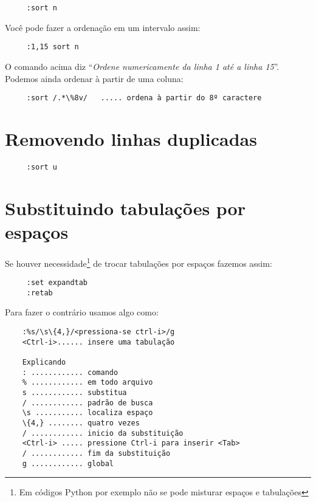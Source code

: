 \begin{verbatim}
     :sort n
\end{verbatim}

Você pode fazer a ordenação em um intervalo assim:

\begin{verbatim}
     :1,15 sort n
\end{verbatim}

O comando acima diz ``{\em Ordene numericamente da linha 1 até a linha 15}''.  
Podemos ainda ordenar à partir de uma coluna:

\begin{verbatim}
     :sort /.*\%8v/   ..... ordena à partir do 8º caractere
\end{verbatim}

\section{Removendo linhas duplicadas}

\begin{verbatim}
     :sort u
\end{verbatim}

\section{Substituindo tabulações por espaços}
\label{sec:Substituindo tabulações por espaços}

Se houver necessidade\footnote{Em códigos Python por exemplo não se pode
misturar espaços e tabulações} de trocar tabulações por espaços
fazemos assim:

\begin{verbatim}
	 :set expandtab
	 :retab
\end{verbatim}

Para fazer o contrário usamos algo como:

\begin{verbatim}
    :%s/\s\{4,}/<pressiona-se ctrl-i>/g
    <Ctrl-i>...... insere uma tabulação

    Explicando
    : ............ comando
    % ............ em todo arquivo 
    s ............ substitua 
    / ............ padrão de busca
    \s ........... localiza espaço
    \{4,} ........ quatro vezes
    / ............ inicio da substituição
    <Ctrl-i> ..... pressione Ctrl-i para inserir <Tab>
    / ............ fim da substituição
    g ............ global

\end{verbatim}


